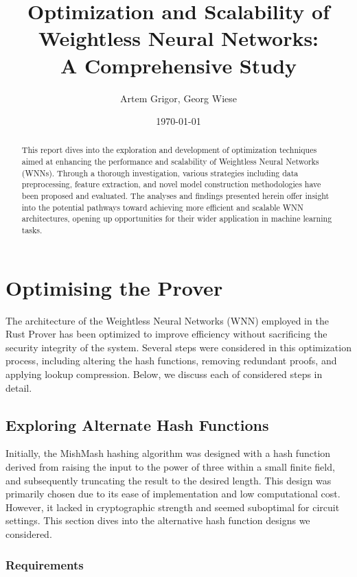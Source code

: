 \documentclass{article}[12pt]
\title{Optimization and Scalability of Weightless Neural Networks:
\\A Comprehensive Study}
\author{Artem Grigor, Georg Wiese}
\date{\today}
\begin{document}
\maketitle

\begin{abstract}
This report dives into the exploration and development of optimization techniques aimed at enhancing the performance and scalability of Weightless Neural Networks (WNNs).
Through a thorough investigation, various strategies including data preprocessing, feature extraction, and novel model construction methodologies have been proposed and evaluated.
The analyses and findings presented herein offer insight into the potential pathways toward achieving more efficient and scalable WNN architectures, opening up opportunities for their wider application in machine learning tasks.
\end{abstract}

\newpage
\tableofcontents
\newpage


\section{Optimising the Prover}\label{sec:optimising-architecture}

The architecture of the Weightless Neural Networks (WNN) employed in the Rust Prover has been optimized to improve efficiency without sacrificing the security integrity of the system.
Several steps were considered in this optimization process, including altering the hash functions, removing redundant proofs, and applying lookup compression.
Below, we discuss each of considered steps in detail.

\subsection{Exploring Alternate Hash Functions}\label{subsec:exploring-alternate-hash-functions}

Initially, the MishMash hashing algorithm was designed with a hash function derived from raising the input to the power of three within a small finite field, and subsequently truncating the result to the desired length.
This design was primarily chosen due to its ease of implementation and low computational cost.
However, it lacked in cryptographic strength and seemed suboptimal for circuit settings.
This section dives into the alternative hash function designs we considered.


\subsubsection{Requirements}\label{subsubsec:requirements}
\end{document}
